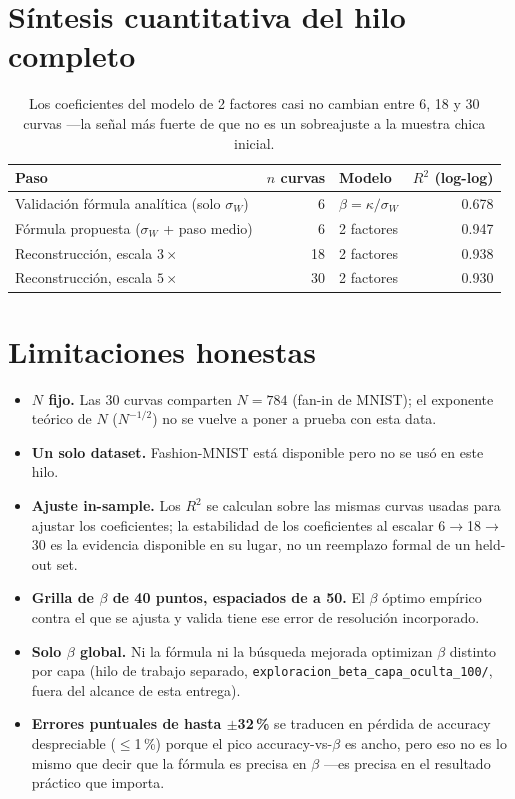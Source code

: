 \documentclass[11pt]{article}
\begin{document}
\section{Síntesis cuantitativa del hilo completo}

\begin{table}[h]\centering
\begin{tabular}{lrlr}\toprule
Paso & $n$ curvas & Modelo & $R^2$ (log-log) \\\midrule
Validación fórmula analítica (solo $\sigma_W$) & 6 & $\beta=\kappa/\sigma_W$ & 0.678 \\
Fórmula propuesta ($\sigma_W$ + paso medio) & 6 & 2 factores & 0.947 \\
Reconstrucción, escala $3\times$ & 18 & 2 factores & 0.938 \\
Reconstrucción, escala $5\times$ & 30 & 2 factores & 0.930 \\\bottomrule
\end{tabular}
\caption{Los coeficientes del modelo de 2 factores casi no cambian entre 6, 18 y 30 curvas
—la señal más fuerte de que no es un sobreajuste a la muestra chica inicial.}
\end{table}

\section{Limitaciones honestas}

\begin{itemize}
\item \textbf{$N$ fijo.} Las 30 curvas comparten $N=784$ (fan-in de MNIST); el exponente
teórico de $N$ ($N^{-1/2}$) no se vuelve a poner a prueba con esta data.
\item \textbf{Un solo dataset.} Fashion-MNIST está disponible pero no se usó en este hilo.
\item \textbf{Ajuste in-sample.} Los $R^2$ se calculan sobre las mismas curvas usadas para
ajustar los coeficientes; la estabilidad de los coeficientes al escalar 6$\to$18$\to$30 es la
evidencia disponible en su lugar, no un reemplazo formal de un held-out set.
\item \textbf{Grilla de $\beta$ de 40 puntos, espaciados de a 50.} El $\beta$ óptimo empírico
contra el que se ajusta y valida tiene ese error de resolución incorporado.
\item \textbf{Solo $\beta$ global.} Ni la fórmula ni la búsqueda mejorada optimizan $\beta$
distinto por capa (hilo de trabajo separado, \texttt{exploracion\_beta\_capa\_oculta\_100/},
fuera del alcance de esta entrega).
\item \textbf{Errores puntuales de hasta $\pm$32\,\%} se traducen en pérdida de accuracy
despreciable ($\leq$1\,\%) porque el pico accuracy-vs-$\beta$ es ancho, pero eso no es lo
mismo que decir que la fórmula es precisa en $\beta$ —es precisa en el resultado práctico que
importa.
\end{itemize}
\end{document}
